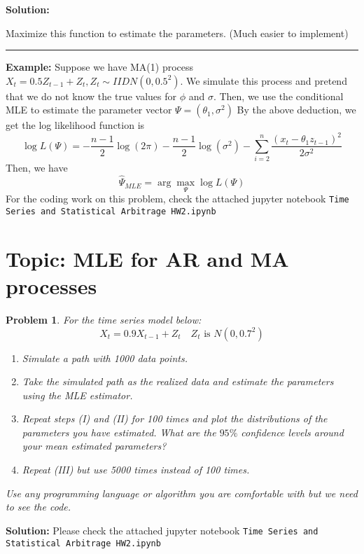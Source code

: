\documentclass[11pt]{article}
\theoremstyle{plain} %
\newtheorem{problem}[theorem]{Problem}
\newenvironment{solution}
{\color{C2}\normalfont\begin{framed}\begingroup\textbf{Solution:} }
  {\endgroup\end{framed}}
\theoremstyle{remark}
\begin{document}
\begin{solution}
\begin{enumerate}[label = (\alph*)]
          Maximize this function to estimate the parameters. (Much easier to implement)\\

          \hrule

          \textbf{Example:} Suppose we have MA(1) process $X_t=0.5Z_{t-1}+Z_t, Z_t \sim IIDN\left(0,0.5^2\right)$. We simulate this process and pretend that we do not know the true values for $\phi$ and $\sigma$.
          Then, we use the conditional MLE to estimate the parameter vector $\Psi=\left(\theta_1, \sigma^2\right)$
          By the above deduction, we get the log likelihood function is
          $$
            \log L(\Psi)=-\frac{n-1}{2} \log (2 \pi)-\frac{n-1}{2} \log \left(\sigma^2\right)-\sum_{i=2}^n \frac{\left(x_t-\theta_1 z_{t-1}\right)^2}{2 \sigma^2}
          $$
          Then, we have
          $$
            \hat{\Psi}_{MLE}=\arg \max_{\Psi} \log L(\Psi)
          $$
          For the coding work on this problem, check the attached jupyter notebook \texttt{Time Series and Statistical Arbitrage HW2.ipynb}
  \end{enumerate}


\end{solution}

\section{Topic: MLE for AR and MA processes}
\begin{problem}
For the time series model below:
$$
  X_{t}=0.9 X_{t-1}+Z_{t} \quad Z_{t} \text{ is } N\left(0,0.7^{2}\right)
$$

\begin{enumerate}[label = (\Roman*)]
  \item Simulate a path with 1000 data points.
  \item Take the simulated path as the realized data and estimate the parameters using the MLE estimator.
  \item Repeat steps (I) and (II) for 100 times and plot the distributions of the parameters you have estimated. What are the $95 \%$ confidence levels around your mean estimated parameters?
  \item Repeat (III) but use 5000 times instead of 100 times.
\end{enumerate}

Use any programming language or algorithm you are comfortable with but we need to see the code.

\end{problem}
\begin{solution}
  Please check the attached jupyter notebook \texttt{Time Series and Statistical Arbitrage HW2.ipynb}
\end{solution}
\end{document}
